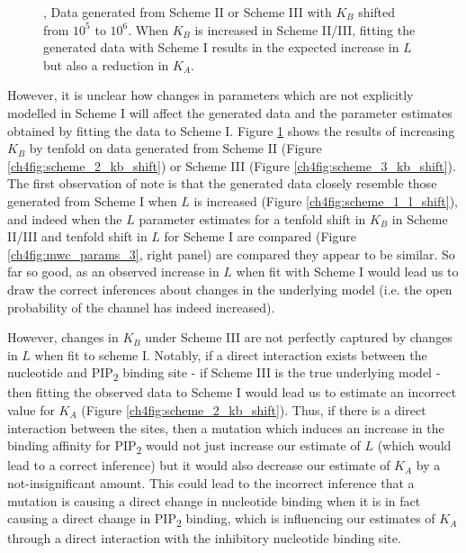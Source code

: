 \begin{figure}[h]
\begin{subfigure}[t]{0.9\textwidth}
	\end{subfigure}
	\caption[Parameter retrieval from MWC models]{
	,  Data generated from  Scheme II  or  Scheme III with $K_B$ shifted from $10^5$ to $10^6$.
	 When $K_B$ is increased in Scheme II/III, fitting the generated data with Scheme I results in the expected increase in $L$ but also a reduction in $K_A$.
	}\label{ch4fig:scheme_2_3_shifts}
\end{figure}

However, it is unclear how changes in parameters which are not explicitly modelled in Scheme I will affect the generated data and the parameter estimates obtained by fitting the data to Scheme I.
Figure \ref{ch4fig:scheme_2_3_shifts} shows the results of increasing $K_B$ by tenfold on data generated from Scheme II (Figure \ref{ch4fig:scheme_2_kb_shift}) or Scheme III (Figure \ref{ch4fig:scheme_3_kb_shift}).
The first observation of note is that the generated data closely resemble those generated from Scheme I when $L$ is increased (Figure \ref{ch4fig:scheme_1_l_shift}), and indeed when the $L$ parameter estimates for a tenfold shift in $K_B$ in Scheme II/III and tenfold shift in $L$ for Scheme I are compared (Figure \ref{ch4fig:mwc_params_3}, right panel) are compared they appear to be similar.
So far so good, as an observed increase in $L$ when fit with Scheme I would lead us to draw the correct inferences about changes in the underlying model (i.e. the open probability of the channel has indeed increased).

However, changes in $K_B$ under Scheme III are not perfectly captured by changes in $L$ when fit to scheme I.
Notably, if a direct interaction exists between the nucleotide and PIP\textsubscript{2} binding site - if Scheme III is the true underlying model - then fitting the observed data to Scheme I would lead us to estimate an incorrect value for $K_A$ (Figure \ref{ch4fig:scheme_2_kb_shift}).
Thus, if there is a direct interaction between the sites, then a mutation which induces an increase in the binding affinity for PIP\textsubscript{2} would not just increase our estimate of $L$ (which would lead to a correct inference) but it would also decrease our estimate of $K_A$ by a not-insignificant amount.
This could lead to the incorrect inference that a mutation is causing a direct change in nucleotide binding when it is in fact causing a direct change in PIP\textsubscript{2} binding, which is influencing our estimates of $K_A$ through a direct interaction with the inhibitory nucleotide binding site.

